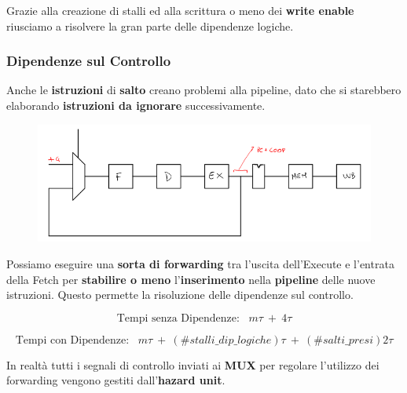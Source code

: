 \documentclass{article}
\begin{document}
Grazie alla creazione di stalli ed alla scrittura o meno dei \textbf{write enable} riusciamo a risolvere la gran parte delle dipendenze logiche.

\subsubsection{Dipendenze sul Controllo}

Anche le \textbf{istruzioni} di \textbf{salto} creano problemi alla pipeline, dato che si starebbero elaborando \textbf{istruzioni da ignorare} successivamente.

\begin{figure}[htbp]
    \center
    \includegraphics[scale=0.45]{img/forwarding_controllo.png}
\end{figure}

Possiamo eseguire una \textbf{sorta di forwarding} tra l'uscita dell'Execute e l'entrata della Fetch per \textbf{stabilire o meno} l'\textbf{inserimento} nella \textbf{pipeline} delle nuove istruzioni. Questo permette la risoluzione delle dipendenze sul controllo. 

\vspace*{-12px}

\[ \text{Tempi senza Dipendenze:} \;\;\; m\tau \: + \: 4\tau \]

\vspace*{-30px}

\[ \text{Tempi con Dipendenze:} \;\;\; m\tau \: + \: (\#stalli\_dip\_logiche)\tau \: + \: (\#salti\_presi)2\tau\]

\vspace*{-8px}

In realtà tutti i segnali di controllo inviati ai \textbf{MUX} per regolare l'utilizzo dei forwarding vengono gestiti dall'\textbf{hazard unit}. 

\newpage
\end{document}
